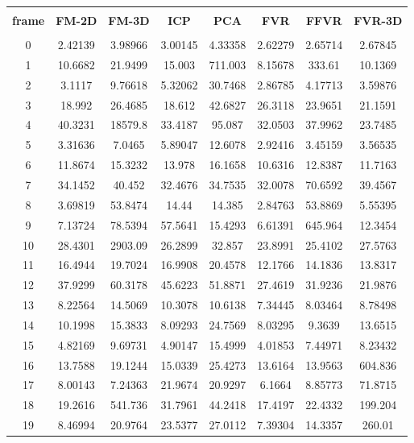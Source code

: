 \begin{center}
\begin{longtable}{cccccccc}
\hline \\
\textbf{frame} & \textbf{FM-2D} & \textbf{FM-3D} & \textbf{ICP} & \textbf{PCA} & \textbf{FVR} & \textbf{FFVR} & \textbf{FVR-3D} \\
\hline \\
0 & 2.42139 & 3.98966 & 3.00145 & 4.33358 & 2.62279 & 2.65714 & 2.67845\\
1 & 10.6682 & 21.9499 & 15.003 & 711.003 & 8.15678 & 333.61 & 10.1369\\
2 & 3.1117 & 9.76618 & 5.32062 & 30.7468 & 2.86785 & 4.17713 & 3.59876\\
3 & 18.992 & 26.4685 & 18.612 & 42.6827 & 26.3118 & 23.9651 & 21.1591\\
4 & 40.3231 & 18579.8 & 33.4187 & 95.087 & 32.0503 & 37.9962 & 23.7485\\
5 & 3.31636 & 7.0465 & 5.89047 & 12.6078 & 2.92416 & 3.45159 & 3.56535\\
6 & 11.8674 & 15.3232 & 13.978 & 16.1658 & 10.6316 & 12.8387 & 11.7163\\
7 & 34.1452 & 40.452 & 32.4676 & 34.7535 & 32.0078 & 70.6592 & 39.4567\\
8 & 3.69819 & 53.8474 & 14.44 & 14.385 & 2.84763 & 53.8869 & 5.55395\\
9 & 7.13724 & 78.5394 & 57.5641 & 15.4293 & 6.61391 & 645.964 & 12.3454\\
10 & 28.4301 & 2903.09 & 26.2899 & 32.857 & 23.8991 & 25.4102 & 27.5763\\
11 & 16.4944 & 19.7024 & 16.9908 & 20.4578 & 12.1766 & 14.1836 & 13.8317\\
12 & 37.9299 & 60.3178 & 45.6223 & 51.8871 & 27.4619 & 31.9236 & 21.9876\\
13 & 8.22564 & 14.5069 & 10.3078 & 10.6138 & 7.34445 & 8.03464 & 8.78498\\
14 & 10.1998 & 15.3833 & 8.09293 & 24.7569 & 8.03295 & 9.3639 & 13.6515\\
15 & 4.82169 & 9.69731 & 4.90147 & 15.4999 & 4.01853 & 7.44971 & 8.23432\\
16 & 13.7588 & 19.1244 & 15.0339 & 25.4273 & 13.6164 & 13.9563 & 604.836\\
17 & 8.00143 & 7.24363 & 21.9674 & 20.9297 & 6.1664 & 8.85773 & 71.8715\\
18 & 19.2616 & 541.736 & 31.7961 & 44.2418 & 17.4197 & 22.4332 & 199.204\\
19 & 8.46994 & 20.9764 & 23.5377 & 27.0112 & 7.39304 & 14.3357 & 260.01\\

\end{longtable}
\end{center}
